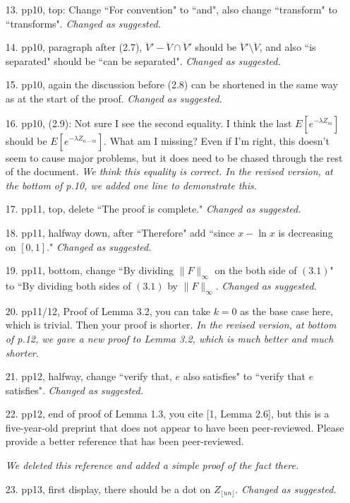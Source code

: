 \documentclass[12pt,a4paper]{amsart}
\numberwithin{equation}{section}
\begin{document}
\begin{itemize}
\\	
\item[13.]
	pp10, top: Change ``For convention" to ``and", also change ``transform" to ``transforms".
	{\it Changed as suggested.}
\\
\item[14.]
	pp10, paragraph after (2.7), $\ddot V' - \ddot V\cap \ddot V'$ should be $\ddot V'\setminus \ddot V$, and also ``is separated" should be ``can be separated".
	{\it Changed as suggested.}
\\
\item [15.]
	pp10, again the discussion before (2.8) can be shortened in the same way as at the start of the proof.
	{\it Changed as suggested.}	
\\
\item [16.]
	pp10, (2.9): Not sure I see the second equality.
	I think the last $E[e^{- \lambda \dot Z_m}]$ should be $E[e^{- \lambda \dot Z_{n-m}}]$.
	What am I missing?
	Even if I'm right, this doesn't seem to cause major problems, but it does need to be chased through the rest of the document.
	{\it We think this equality is correct.
	In the revised version, at the bottom of p.10, we added 
one line
to demonstrate this.}
\\
\item [17.]
	pp11, top, delete ``The proof is complete."
	{\it Changed as suggested.}
\\
\item [18.]
	pp11, halfway down, after ``Therefore" add ``since $x - \ln x$ is decreasing on $[0,1]$."
	{\it Changed as suggested.}
\\
\item [19.]
	pp11, bottom, change ``By dividing $\|F\|_\infty$ on the both side of $(3.1)$" to ``By dividing both sides of $(3.1)$ by $\|F\|_\infty$.
	{\it Changed as suggested.}
\\
\item [20.]
	pp11/12, Proof of Lemma 3.2, you can take $k = 0$ as the base case here, which is trivial.
	Then your proof is shorter.
	{\it
	In the revised version, at bottom of p.12, we gave a new proof to Lemma 3.2, which is much better and much shorter. }
\\
\item [21.]
	pp12, halfway, change ``verify that, $e$ also satisfies" to ``verify that $e$ satisfies".
	{\it Changed as suggested.}
\\
\item[22.]
	pp12, end of proof of Lemma 1.3, you cite [1, Lemma 2.6], but this is a five-year-old preprint that does not appear to have been peer-reviewed.
	Please provide a better reference that has been peer-reviewed.
	
	{\it 
We deleted this reference and added a simple proof of the fact there.	
	}
\\
\item [23.]
	pp13, first display, there should be a dot on $Z_{\lfloor un \rfloor}$.
	{\it Changed as suggested.}		
\end{itemize}
\end{document}
